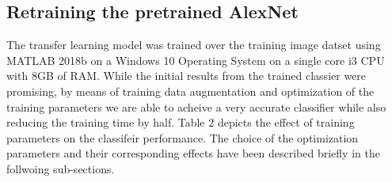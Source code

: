 \documentclass[doc/report.tex]{subfiles}
\begin{document}
\subsection{Retraining the pretrained AlexNet}
The transfer learning model was trained over the training image datset using MATLAB 2018b on a Windows 10 Operating System on a single core i3 CPU with 8GB of RAM. While the initial results from the trained classier were promising, by means of training data augmentation and optimization of the training parameters we are able to acheive a very accurate classifier while also reducing the training time by half. Table 2 depicts the effect of training parameters on the classifeir performance. The choice of the optimization parameters and their corresponding effects have been described briefly in the follwoing sub-sections.

\begin{table}[h]
\centering
\caption{Training Parameter Analysis}
\label{tab:my-table2}
\end{table}
\end{document}
